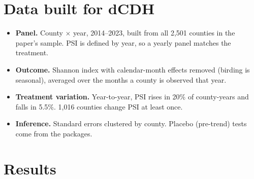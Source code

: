 \documentclass[11pt]{article}
\begin{document}
\section{Data built for dCDH}
\begin{itemize}[leftmargin=14pt,itemsep=2pt]
\item \textbf{Panel.} County $\times$ year, 2014--2023, built from all 2,501 counties in the paper's sample. PSI is defined by year, so a yearly panel matches the treatment.
\item \textbf{Outcome.} Shannon index with calendar-month effects removed (birding is seasonal), averaged over the months a county is observed that year.
\item \textbf{Treatment variation.} Year-to-year, PSI rises in 20\% of county-years and falls in 5.5\%. 1,016 counties change PSI at least once.
\item \textbf{Inference.} Standard errors clustered by county. Placebo (pre-trend) tests come from the packages.
\end{itemize}

\section{Results}
\end{document}
